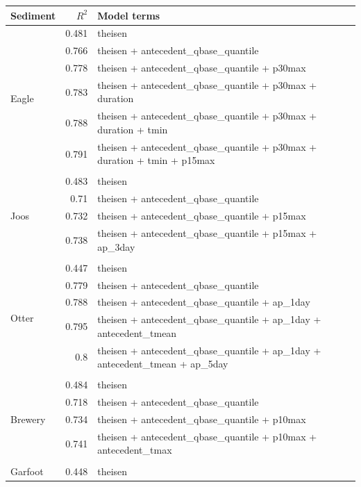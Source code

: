 \documentclass[10pt]{article}
\begin{document}
\begin{table}[h] \small
    \begin{center}
    \begin{tabular}{lrl}
    \textbf{Sediment} & $R^2$ & Model terms \\
    \hline
\multirow{7}{*}{Eagle} & 0.481 & theisen\\ 
 & 0.766 & theisen + antecedent\_qbase\_quantile\\ 
 & 0.778 & theisen + antecedent\_qbase\_quantile + p30max\\ 
 & 0.783 & theisen + antecedent\_qbase\_quantile + p30max + duration\\ 
 & 0.788 & theisen + antecedent\_qbase\_quantile + p30max + duration + tmin\\ 
 & 0.791 & theisen + antecedent\_qbase\_quantile + p30max + duration + tmin + p15max\\ 
\vspace{2mm}\\ \multirow{5}{*}{Joos} & 0.483 & theisen\\ 
 & 0.71 & theisen + antecedent\_qbase\_quantile\\ 
 & 0.732 & theisen + antecedent\_qbase\_quantile + p15max\\ 
 & 0.738 & theisen + antecedent\_qbase\_quantile + p15max + ap\_3day\\ 
\vspace{2mm}\\ \multirow{6}{*}{Otter} & 0.447 & theisen\\ 
 & 0.779 & theisen + antecedent\_qbase\_quantile\\ 
 & 0.788 & theisen + antecedent\_qbase\_quantile + ap\_1day\\ 
 & 0.795 & theisen + antecedent\_qbase\_quantile + ap\_1day + antecedent\_tmean\\ 
 & 0.8 & theisen + antecedent\_qbase\_quantile + ap\_1day + antecedent\_tmean + ap\_5day\\ 
\vspace{2mm}\\ \multirow{5}{*}{Brewery} & 0.484 & theisen\\ 
 & 0.718 & theisen + antecedent\_qbase\_quantile\\ 
 & 0.734 & theisen + antecedent\_qbase\_quantile + p10max\\ 
 & 0.741 & theisen + antecedent\_qbase\_quantile + p10max + antecedent\_tmax\\ 
\vspace{2mm}\\ \multirow{5}{*}{Garfoot} & 0.448 & theisen\\ 

\end{tabular}
\end{center}
\end{table}
\end{document}
